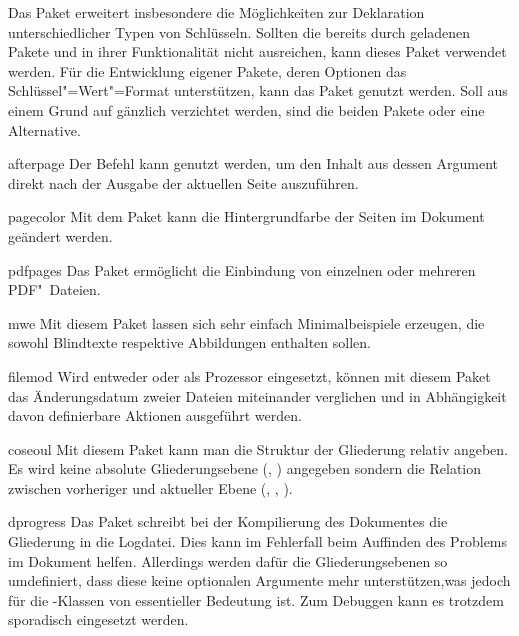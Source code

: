 \begin{packages}
  Das Paket  erweitert insbesondere die Möglichkeiten zur 
  Deklaration unterschiedlicher Typen von Schlüsseln. Sollten die bereits durch 
  \TUDScript geladenen Pakete  und  in ihrer 
  Funktionalität nicht ausreichen, kann dieses Paket verwendet werden. Für die 
  Entwicklung eigener Pakete, deren Optionen das Schlüssel"=Wert"=Format 
  unterstützen, kann das Paket  genutzt werden. Soll aus einem 
  Grund auf \KOMAScript{} gänzlich verzichtet werden, sind die beiden Pakete 
   oder  eine Alternative.
\item[afterpage]
  Der Befehl \Parameter{\dots} kann genutzt werden, um den 
  Inhalt aus dessen Argument direkt nach der Ausgabe der aktuellen Seite 
  auszuführen.
\item[pagecolor]
  Mit dem Paket kann die Hintergrundfarbe der Seiten im Dokument geändert 
  werden.
\item[pdfpages]
  Das Paket ermöglicht die Einbindung von einzelnen oder mehreren PDF"~Dateien.
\item[mwe]
  Mit diesem Paket lassen sich sehr einfach Minimalbeispiele erzeugen, die 
  sowohl Blindtexte respektive Abbildungen enthalten sollen.
\item[filemod]
  Wird entweder  oder  als Prozessor 
  eingesetzt, können mit diesem Paket das Änderungsdatum zweier Dateien 
  miteinander verglichen und in Abhängigkeit davon definierbare Aktionen 
  ausgeführt werden.
\item[coseoul]
  Mit diesem Paket kann man die Struktur der Gliederung relativ angeben. Es 
  wird keine absolute Gliederungsebene (, ) 
  angegeben sondern die Relation zwischen vorheriger und aktueller Ebene 
  (, , ).
\item[dprogress]
  Das Paket schreibt bei der Kompilierung des Dokumentes die Gliederung in die 
  Logdatei. Dies kann im Fehlerfall beim Auffinden des Problems im Dokument 
  helfen. Allerdings werden dafür die Gliederungsebenen so umdefiniert, dass 
  diese keine optionalen Argumente mehr unterstützen,was jedoch für die 
  \TUDScript-Klassen von essentieller Bedeutung ist. Zum Debuggen kann es 
  trotzdem sporadisch eingesetzt werden.
\end{packages}

